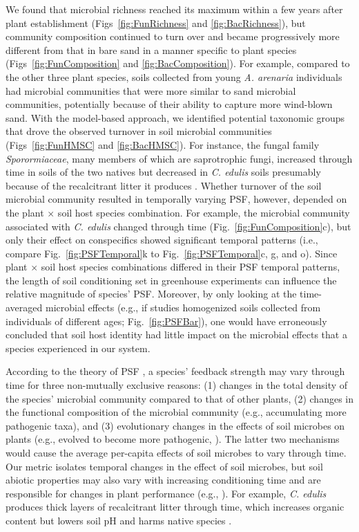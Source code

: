 We found that microbial richness reached its maximum within a few years after plant establishment (Figs~\ref{fig:FunRichness} and \ref{fig:BacRichness}), but community composition continued to turn over and became progressively more different from that in bare sand in a manner specific to plant species (Figs~\ref{fig:FunComposition} and \ref{fig:BacComposition}). 
For example, compared to the other three plant species, soils collected from young \textit{A. arenaria} individuals had microbial communities that were more similar to sand microbial communities, potentially because of their ability to capture more wind-blown sand.
With the model-based approach, we identified potential taxonomic groups that drove the observed turnover in soil microbial communities (Figs~\ref{fig:FunHMSC} and \ref{fig:BacHMSC}). For instance, the fungal family \textit{Sporormiaceae}, many members of which are saprotrophic fungi, increased through time in soils of the two natives but decreased in \textit{C. edulis} soils presumably because of the recalcitrant litter it produces \citep{Novoa2014}.
Whether turnover of the soil microbial community resulted in temporally varying PSF, however, depended on the plant $\times$ soil host species combination. For example, the microbial community associated with \textit{C. edulis} changed through time (Fig.~\ref{fig:FunComposition}c), but only their effect on conspecifics showed significant temporal patterns (i.e., compare Fig.~\ref{fig:PSFTemporal}k to Fig.~\ref{fig:PSFTemporal}c, g, and o).
Since plant $\times$ soil host species combinations differed in their PSF temporal patterns, the length of soil conditioning set in greenhouse experiments can influence the relative magnitude of species' PSF.
Moreover, by only looking at the time-averaged microbial effects (e.g., if studies homogenized soils collected from individuals of different ages; Fig.~\ref{fig:PSFBar}), one would have erroneously concluded that soil host identity had little impact on the microbial effects that a species experienced in our system.
\par


According to the theory of PSF \citep{Bever1997}, a species' feedback strength may vary through time for three non-mutually exclusive reasons: (1) changes in the total density of the species' microbial community compared to that of other plants, (2) changes in the functional composition of the microbial community (e.g., accumulating more pathogenic taxa), and (3) evolutionary changes in the effects of soil microbes on plants (e.g., evolved to become more pathogenic, \citealp{Dostal2013, Packer2004}). The latter two mechanisms would cause the average per-capita effects of soil microbes to vary through time.
Our metric isolates temporal changes in the effect of soil microbes, but soil abiotic properties may also vary with increasing conditioning time and are responsible for changes in plant performance (e.g., \citealp{Lepinay2018}). For example, \textit{C. edulis} produces thick layers of recalcitrant litter through time, which increases organic content but lowers soil pH and harms native species \citep{Conser2009, Novoa2014}. 
\par



